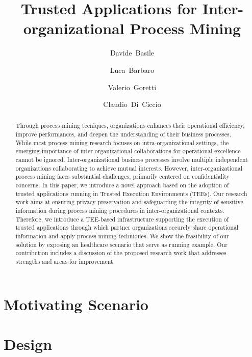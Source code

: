 \documentclass[runningheads]{llncs}
\begin{document}
%
\title{
}
%
%
\author{Davide~Basile \and
Luca~Barbaro \and
Valerio~Goretti \and Claudio~Di~Ciccio}
%
%
%
\title{Trusted Applications for Inter-organizational Process Mining}
\maketitle

\begin{abstract}
 Through process mining tecniques, organizations enhances their operational efficiency, improve performances, and deepen the understanding of their business processes. While most process mining research focuses on intra-organizational settings, the emerging importance of inter-organizational collaborations for operational excellence cannot be ignored. Inter-organizational business processes involve multiple independent organizations collaborating to achieve mutual interests. However, inter-organizational process mining faces substantial challenges, primarily centered on confidentiality concerns. In this paper, we introduce a novel approach based on the adoption of trusted applications running in Trusted Execution Environments (TEEs). Our research work aims at ensuring privacy preservation and safeguarding the integrity of sensitive information during process mining procedures in inter-organizational contexts. Therefore, we introduce a TEE-based infrastructure supporting the execution of trusted applications through which partner organizations securely share operational information and apply process mining techniques. We show the feasibility of our solution by exposing an healthcare scenario that serve as running example. Our contribution includes a discussion of the proposed research work that addresses strengths and areas for improvement.
\end{abstract}





\section{Motivating Scenario}\label{sec:motivating}

\section{Design}\label{sec:design}







\end{document}
